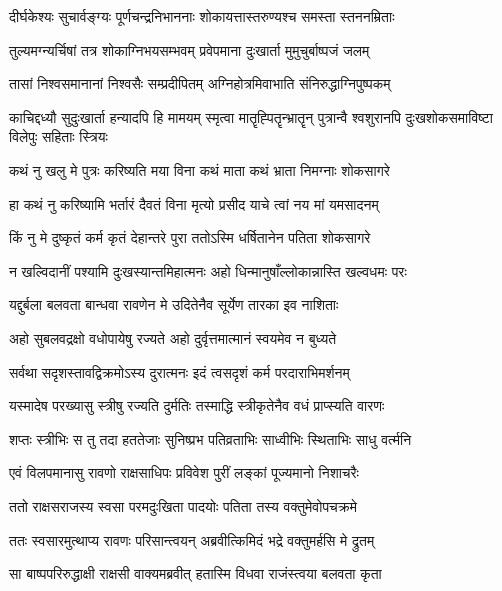\twolineshloka
{दीर्घकेश्यः सुचार्वङ्ग्यः पूर्णचन्द्रनिभाननाः}
{शोकायत्तास्तरुण्यश्च समस्ता स्तननम्रिताः} %

\twolineshloka
{तुल्यमग्न्यर्चिषां तत्र शोकाग्निभयसम्भवम्}
{प्रवेपमाना दुःखार्ता मुमुचुर्बाष्पजं जलम्} %

\twolineshloka
{तासां निश्वसमानानां निश्वसैः सम्प्रदीपितम्}
{अग्निहोत्रमिवाभाति संनिरुद्धाग्निपुष्पकम्} %

\threelineshloka
{काचिद्दध्यौ सुदुःखार्ता हन्यादपि हि मामयम्}
{स्मृत्वा मातॄह्पितॄन्भ्रातॄन् पुत्रान्वै श्वशुरानपि}
{दुःखशोकसमाविष्टा विलेपुः सहिताः स्त्रियः} %

\twolineshloka
{कथं नु खलु मे पुत्रः करिष्यति मया विना}
{कथं माता कथं भ्राता निमग्नाः शोकसागरे} %

\twolineshloka
{हा कथं नु करिष्यामि भर्तारं दैवतं विना}
{मृत्यो प्रसीद याचे त्वां नय मां यमसादनम्} %

\twolineshloka
{किं नु मे दुष्कृतं कर्म कृतं देहान्तरे पुरा}
{ततोऽस्मि धर्षितानेन पतिता शोकसागरे} %

\twolineshloka
{न खल्विदानीं पश्यामि दुःखस्यान्तमिहात्मनः}
{अहो धिन्मानुषाँल्लोकान्नास्ति खल्वधमः परः} %

\twolineshloka
{यद्दुर्बला बलवता बान्धवा रावणेन मे}
{उदितेनैव सूर्येण तारका इव नाशिताः} %

\twolineshloka
{अहो सुबलवद्रक्षो वधोपायेषु रज्यते}
{अहो दुर्वृत्तमात्मानं स्वयमेव न बुध्यते} %

\twolineshloka
{सर्वथा सदृशस्तावद्विक्रमोऽस्य दुरात्मनः}
{इदं त्वसदृशं कर्म परदाराभिमर्शनम्} %

\twolineshloka
{यस्मादेष परख्यासु स्त्रीषु रज्यति दुर्मतिः}
{तस्माद्धि स्त्रीकृतेनैव वधं प्राप्स्यति वारणः} %

\twolineshloka
{शप्तः स्त्रीभिः स तु तदा हततेजाः सुनिष्प्रभ}
{पतिव्रताभिः साध्वीभिः स्थिताभिः साधु वर्त्मनि} %

\twolineshloka
{एवं विलपमानासु रावणो राक्षसाधिपः}
{प्रविवेश पुरीं लङ्कां पूज्यमानो निशाचरैः} %

\twolineshloka
{ततो राक्षसराजस्य स्वसा परमदुःखिता}
{पादयोः पतिता तस्य वक्तुमेवोपचक्रमे} %

\twolineshloka
{ततः स्वसारमुत्थाप्य रावणः परिसान्त्वयन्}
{अब्रवीत्किमिदं भद्रे वक्तुमर्हसि मे द्रुतम्} %

\twolineshloka
{सा बाष्पपरिरुद्धाक्षी राक्षसी वाक्यमब्रवीत्}
{हतास्मि विधवा राजंस्त्वया बलवता कृता} %

